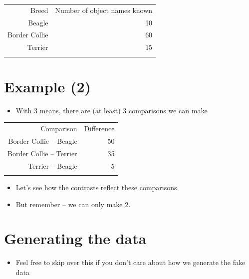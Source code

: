 \documentclass[]{article}
\begin{document}
\begin{longtable}[c]{@{}rr@{}}
\toprule\addlinespace
Breed & Number of object names known
\\\addlinespace
\midrule\endhead
Beagle & 10
\\\addlinespace
Border Collie & 60
\\\addlinespace
Terrier & 15
\\\addlinespace
\bottomrule
\end{longtable}

\section{Example (2)}\label{example-2}

\begin{itemize}
\itemsep1pt\parskip0pt
\item
  With 3 means, there are (at least) 3 comparisons we can make
\end{itemize}

\begin{longtable}[c]{@{}rr@{}}
\toprule\addlinespace
Comparison & Difference
\\\addlinespace
\midrule\endhead
Border Collie -- Beagle & 50
\\\addlinespace
Border Collie -- Terrier & 35
\\\addlinespace
Terrier -- Beagle & 5
\\\addlinespace
\bottomrule
\end{longtable}

\begin{itemize}
\itemsep1pt\parskip0pt
\item
  Let's see how the contrasts reflect these comparisons
\item
  But remember -- we can only make 2.
\end{itemize}

\section{Generating the data}\label{generating-the-data}

\begin{itemize}
\itemsep1pt\parskip0pt
\item
  Feel free to skip over this if you don't care about how we generate
  the fake data
\end{itemize}
\end{document}
